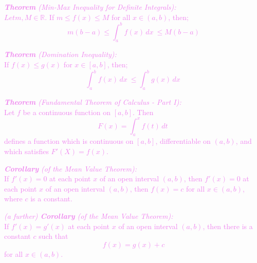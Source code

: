 \documentclass{report}
\newenvironment{theorem}[1][Violet]
  {\begin{tcolorbox}[colframe=#1,colback=white]}
  {\end{tcolorbox}}
\begin{document}
\begin{theorem}
    \textcolor{Violet}{\textit{\textbf{Theorem} (Min-Max Inequality for Definite Integrals):}\\
    $Let m, M \in \mathbb{R}$. If $m \leq f(x) \leq M$ for all $x \in (a,b)$, then;
    \begin{equation}
        m(b-a) \leq \int_a^b f(x) \,dx\ \leq M(b-a)
    \end{equation}}
\end{theorem}

\begin{theorem}
    \textcolor{Violet}{\textit{\textbf{Theorem} (Domination Inequality):}\\
    If $f(x) \leq g(x)$ for $x \in [a,b]$, then;
    \begin{equation}
        \int_a^b f(x) \,dx\ \leq \int_a^b g(x) \,dx\
    \end{equation}}
\end{theorem}


\begin{theorem}
    \textcolor{Violet}{\textit{\textbf{Theorem} (Fundamental Theorem of Calculus - Part I):}\\
    Let $f$ be a continuous function on $[a,b]$. Then
    \begin{equation}
        F(x) = \int_a^x f(t) \,dt\
    \end{equation}
    defines a function which is continuous on $[a,b]$, differentiable on $(a,b)$, and which satisfies $F'(X) = f(x)$.}
\end{theorem}

\begin{theorem}
    \textcolor{Violet}{\textit{\textbf{Corollary} (of the Mean Value Theorem):}\\
    If $f'(x) = 0$ at each point $x$ of an open interval $(a,b)$, then $f'(x) = 0$ at each point $x$ of an open interval $(a,b)$, then $f(x) = c$ for all $x \in (a,b)$, where $c$ is a constant.}
\end{theorem}

\begin{theorem}
    \textcolor{Violet}{\textit{(a further) \textbf{Corollary} (of the Mean Value Theorem):}\\
    If $f'(x) = g'(x)$ at each point $x$ of an open interval $(a,b)$, then there is a constant $c$ such that
    \begin{equation}
        f(x) = g(x) + c
    \end{equation}
    for all $x \in (a,b)$.}
\end{theorem}
\end{document}
